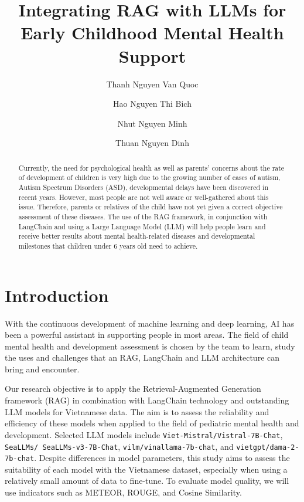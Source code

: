 \documentclass[runningheads]{llncs}
\begin{document}
\title{Integrating RAG with LLMs for Early Childhood Mental Health Support}

\author{Thanh Nguyen Van Quoc \and
Hao Nguyen Thi Bich \and
Nhut Nguyen Minh \and
Thuan Nguyen Dinh}



\maketitle

\begin{abstract}
Currently, the need for psychological health as well as parents’ concerns about the rate of development of children is very high due to the growing number of cases of autism, Autism Spectrum Disorders (ASD), developmental delays have been discovered in recent years. However, most people are not well aware or well-gathered about this issue. Therefore, parents or relatives of the child have not yet given a correct objective assessment of these diseases. The use of the RAG framework, in conjunction with LangChain and using a Large Language Model (LLM) will help people learn and receive better results about mental health-related diseases and developmental milestones that children under 6 years old need to achieve.
\end{abstract}

\section{Introduction}
\label{sec:introduction}
With the continuous development of machine learning and deep learning, AI has been a powerful assistant in supporting people in most areas. The field of child mental health and development assessment is chosen by the team to learn, study the uses and challenges that an RAG, LangChain and LLM architecture can bring and encounter.

Our research objective is to apply the Retrieval-Augmented Generation framework (RAG) in combination with LangChain technology and outstanding LLM models for Vietnamese data. The aim is to assess the reliability and efficiency of these models when applied to the field of pediatric mental health and development. Selected LLM models include \texttt{Viet-Mistral/Vistral-7B-Chat}, \texttt{SeaLLMs/ SeaLLMs-v3-7B-Chat}, \texttt{vilm/vinallama-7b-chat}, and \texttt{vietgpt/dama-2-7b-chat}. Despite differences in model parameters, this study aims to assess the suitability of each model with the Vietnamese dataset, especially when using a relatively small amount of data to fine-tune. To evaluate model quality, we will use indicators such as METEOR, ROUGE, and Cosine Similarity.
\end{document}
